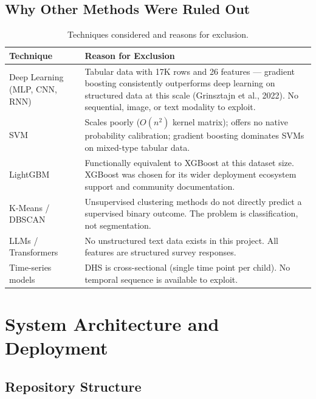 \documentclass[12pt, a4paper]{article}
\begin{document}
\subsection{Why Other Methods Were Ruled Out}

\begin{table}[H]
\centering
\caption{Techniques considered and reasons for exclusion.}
\label{tab:exclusions}
\begin{tabular}{p{3.8cm}p{9.5cm}}
\toprule
\textbf{Technique} & \textbf{Reason for Exclusion} \\
\midrule
Deep Learning (MLP, CNN, RNN) & Tabular data with 17K rows and 26 features — gradient boosting consistently outperforms deep learning on structured data at this scale (Grinsztajn et al., 2022). No sequential, image, or text modality to exploit. \\
\addlinespace
SVM & Scales poorly ($O(n^2)$ kernel matrix); offers no native probability calibration; gradient boosting dominates SVMs on mixed-type tabular data. \\
\addlinespace
LightGBM & Functionally equivalent to XGBoost at this dataset size. XGBoost was chosen for its wider deployment ecosystem support and community documentation. \\
\addlinespace
K-Means / DBSCAN & Unsupervised clustering methods do not directly predict a supervised binary outcome. The problem is classification, not segmentation. \\
\addlinespace
LLMs / Transformers & No unstructured text data exists in this project. All features are structured survey responses. \\
\addlinespace
Time-series models & DHS is cross-sectional (single time point per child). No temporal sequence is available to exploit. \\
\bottomrule
\end{tabular}
\end{table}


\section{System Architecture and Deployment}

\subsection{Repository Structure}
\end{document}
